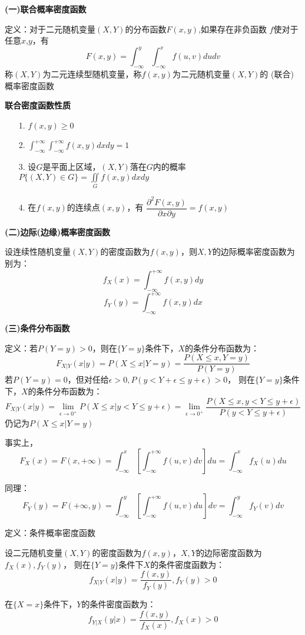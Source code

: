 \textbf{(一)联合概率密度函数}


定义：对于二元随机变量$(X,Y)$的分布函数$F(x,y)$,如果存在非负函数
$f$使对于任意$x$,$y$，有$$F(x,y)=\int _{-\infty}^y\int _{-\infty}^x
f(u,v)dudv$$
称$(X,Y)$为二元连续型随机变量，称$f(x,y)$为二元随机变量$(X,Y)$的
(联合)概率密度函数


\textbf{联合密度函数性质}
\begin{itemize}
    \item [1.]$f(x,y)\geq 0$
    \item [2.]$\int _{-\infty}^{+\infty}\int _{-\infty}^{+\infty}
    f(x,y)dxdy=1$
    \item [3.]设$G$是平面上区域，$(X,Y)$落在$G$内的概率
    $P\{(X,Y)\in G\}=\iint \limits_{G}f(x,y)dxdy$
    \item [4.]在$f(x,y)$的连续点$(x,y)$，有
    $\dfrac{\partial ^2 F(x,y)}{\partial x \partial y}=f(x,y)$
\end{itemize}


\textbf{(二)边际(边缘)概率密度函数}


设连续性随机变量$(X,Y)$的密度函数为$f(x,y)$，则$X,Y$的边际概率密度函数为别为：
$$f_X(x)=\int _{-\infty}^{+\infty}f(x,y)dy$$
$$f_Y(y)=\int _{-\infty}^{+\infty}f(x,y)dx$$


\textbf{(三)条件分布函数}


定义：若$P(Y=y)>0$，则在$\{Y=y\}$条件下，$X$的条件分布函数为：
$$F_{X|Y}(x|y)=P(X\leq x|Y=y)=\dfrac{P(X\leq x,Y=y)}{P(Y=y)}$$
若$P(Y=y)=0$，但对任给$\epsilon >0,P(y<Y+\epsilon \leq y+\epsilon)>0$，
则在$\{Y=y\}$条件下，$X$的条件分布函数为：
$$F_{X|Y}(x|y)=\lim\limits_{\epsilon \to 0^+}P(X\leq x|y<Y\leq y+\epsilon)
=\lim\limits_{\epsilon \to 0^+} \dfrac{P(X\leq x,y<Y\leq y+\epsilon)}{P(y<Y\leq y+\epsilon)}$$
仍记为$P(X\leq x|Y=y)$


事实上，
$$F_X(x)=F(x,+\infty)=\int _{-\infty}^x [\int _{-\infty}^{+\infty}f(u,v)dv]du
=\int _{-\infty}^xf_X(u)du$$


同理：
$$F_Y(y)=F(+\infty,y)=\int _{-\infty}^y[\int _{-\infty}^{+\infty}f(u,v)du]dv
=\int _{-\infty}^y f_Y(v)dv$$


定义：条件概率密度函数


设二元随机变量$(X,Y)$的密度函数为$f(x,y)$，$X,Y$的边际密度函数为$f_X(x),f_Y(y)$，
则在$\{Y=y\}$条件下$X$的条件密度函数为：
$$f_{X|Y}(x|y)=\dfrac{f(x,y)}{f_Y(y)},f_Y(y)>0$$


在$\{X=x\}$条件下，$Y$的条件密度函数为：
$$f_{Y|X}(y|x)=\dfrac{f(x,y)}{f_X(x)},f_X(x)>0$$


